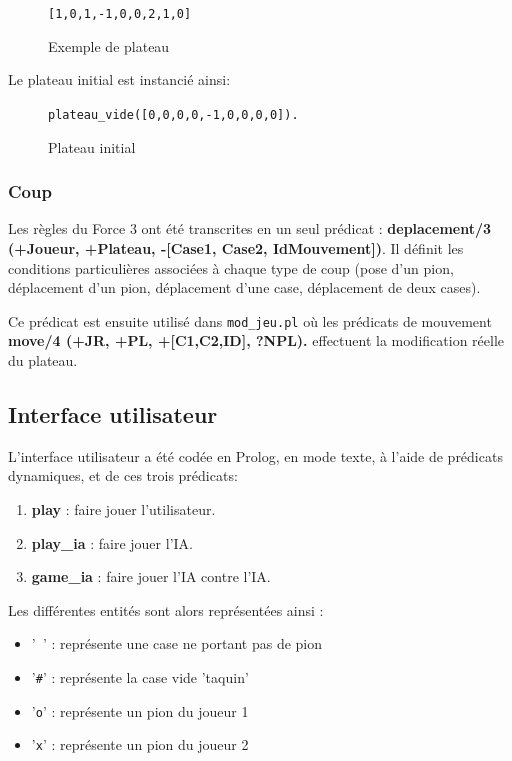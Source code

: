 \documentclass[a4paper,12pt]{article}
\newcommand{\code}[1]{\texttt{#1}}
\begin{document}
  \begin{figure}[h]
    \code{[1,0,1,-1,0,0,2,1,0]}
    \centering
    \caption{Exemple de plateau}
  \end{figure}
  
Le plateau initial est instancié ainsi:\\
  \begin{figure}[h]
\code{plateau\_vide([0,0,0,0,-1,0,0,0,0]).}
    \centering
    \caption{Plateau initial}
  \end{figure}

\subsubsection{Coup}
Les règles du Force 3 ont été transcrites en un seul prédicat : \textbf{deplacement/3 (+Joueur, +Plateau, -[Case1, Case2, IdMouvement])}. Il définit les conditions particulières associées à chaque type de coup (pose d'un pion, déplacement d'un pion, déplacement d'une case, déplacement de deux cases).

Ce prédicat est ensuite utilisé dans \texttt{mod\_jeu.pl} où les prédicats de mouvement \textbf{move/4 (+JR, +PL, +[C1,C2,ID], ?NPL).} effectuent la modification réelle du plateau.

\subsection{Interface utilisateur}
L'interface utilisateur a été codée en Prolog, en mode texte, à l'aide de prédicats dynamiques, et de
ces trois prédicats:

\begin{enumerate}
    \item \textbf{play} : faire jouer l'utilisateur.
    \item \textbf{play\_ia} : faire jouer l'IA.
    \item \textbf{game\_ia} : faire jouer l'IA contre l'IA.
\end{enumerate}
Les différentes entités sont alors représentées ainsi :

\begin{itemize}
    \item{'\texttt{ }' : représente une case ne portant pas de pion}
    \item{'\texttt{\#}' : représente la case vide 'taquin'}
    \item{'\texttt{o}' : représente un pion du joueur 1}
    \item{'\texttt{x}' : représente un pion du joueur 2}
\end{itemize}
\end{document}
